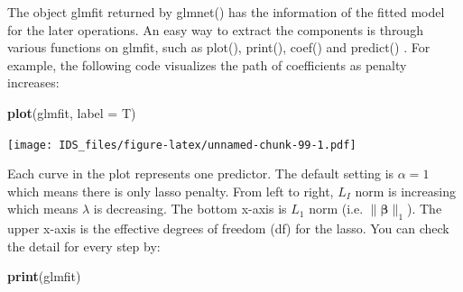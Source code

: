 \documentclass[12pt,]{krantz}
\makeatletter
\newenvironment{Shaded}{\begin{snugshade}}{\end{snugshade}}
\newcommand{\CommentTok}[1]{\textcolor[rgb]{0.37,0.37,0.37}{\textit{#1}}}
\newcommand{\DataTypeTok}[1]{\textcolor[rgb]{0.27,0.27,0.27}{#1}}
\newcommand{\DecValTok}[1]{\textcolor[rgb]{0.06,0.06,0.06}{#1}}
\newcommand{\KeywordTok}[1]{\textcolor[rgb]{0.27,0.27,0.27}{\textbf{#1}}}
\newcommand{\NormalTok}[1]{#1}
\newcommand{\OperatorTok}[1]{\textcolor[rgb]{0.43,0.43,0.43}{\textbf{#1}}}
\newcommand{\StringTok}[1]{\textcolor[rgb]{0.5,0.5,0.5}{#1}}
\newenvironment{kframe}{%
\medskip{}
\setlength{\fboxsep}{.8em}
 \def\at@end@of@kframe{}%
 \ifinner\ifhmode%
  \def\at@end@of@kframe{\end{minipage}}%
  \begin{minipage}{\columnwidth}%
 \fi\fi%
 \def\FrameCommand##1{\hskip\@totalleftmargin \hskip-\fboxsep
 \colorbox{shadecolor}{##1}\hskip-\fboxsep
     \hskip-\linewidth \hskip-\@totalleftmargin \hskip\columnwidth}%
 \MakeFramed {\advance\hsize-\width
   \@totalleftmargin\z@ \linewidth\hsize
   \@setminipage}}%
 {\par\unskip\endMakeFramed%
 \at@end@of@kframe}
\renewenvironment{Shaded}{\begin{kframe}}{\end{kframe}}
\makeatother
\begin{document}
\begin{Shaded}
\end{Shaded}

The object glmfit returned by glmnet() has the information of the fitted model for the later operations. An easy way to extract the components is through various functions on glmfit, such as plot(), print(), coef() and predict() . For example, the following code visualizes the path of coefficients as penalty increases:

\begin{Shaded}
\begin{Highlighting}[]
\KeywordTok{plot}\NormalTok{(glmfit, }\DataTypeTok{label =}\NormalTok{ T)}
\end{Highlighting}
\end{Shaded}

\texttt{[image: IDS\_files/figure-latex/unnamed-chunk-99-1.pdf]}

Each curve in the plot represents one predictor. The default setting is \(\alpha=1\) which means there is only lasso penalty. From left to right, \(L_I\) norm is increasing which means \(\lambda\) is decreasing. The bottom x-axis is \(L_1\) norm (i.e. \(\parallel\mathbf{\beta}\parallel_{1}\)). The upper x-axis is the effective degrees of freedom (df) for the lasso. You can check the detail for every step by:

\begin{Shaded}
\begin{Highlighting}[]
\KeywordTok{print}\NormalTok{(glmfit)}
\end{Highlighting}
\end{Shaded}
\end{document}
